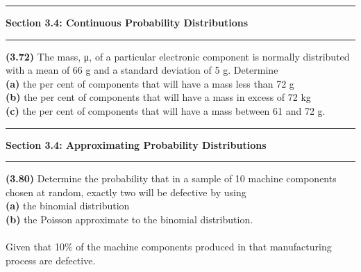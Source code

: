 \documentclass[11pt]{article}
\newcommand\question[2]{\vspace{.25in}\hrule\textbf{#1: #2}\vspace{.5em}\hrule\vspace{.10in}}
\renewcommand\part[1]{\vspace{.10in}\textbf{(#1)}}
\begin{document}
\clearpage

\question{Section 3.4}{Continuous Probability Distributions}

\part{3.72} The mass, μ, of a particular electronic component is normally distributed with a mean of 66 g and a standard deviation of 5 g. Determine \\

\part{a}  the per cent of components that will have a mass less than 72 g \\
\part{b}  the per cent of components that will have a mass in excess of 72 kg \\
\part{c}  the per cent of components that will have a mass between 61 and 72 g. \\

\question{Section 3.4}{Approximating Probability Distributions}

\part{3.80} Determine the probability that in a sample of 10 machine components chosen at random, exactly two will be defective by using \\

\part{a}  the binomial distribution \\
\part{b}  the Poisson approximate to the binomial distribution. \\ \ \\
Given that 10\% of the machine components produced in that manufacturing process are defective.
\end{document}

